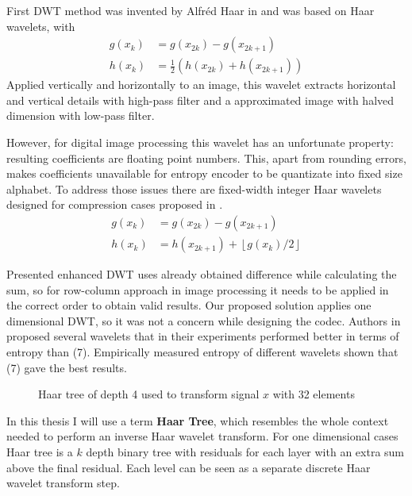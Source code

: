 First DWT method was invented by Alfréd Haar in \cite{haar1910wavelet} and was based on Haar wavelets, with 
\begin{align}
    g(x_k) &= g(x_{2k}) - g(x_{2k+1})\\
    h(x_k) &= \frac{1}{2} (h(x_{2k}) + h(x_{2k+1}))
\end{align}
Applied vertically and horizontally to an image, this wavelet extracts horizontal and vertical details
with high-pass filter and a approximated image with halved dimension with low-pass filter.

However, for digital image processing this wavelet has an unfortunate property: resulting coefficients
are floating point numbers. This, apart from rounding errors, makes coefficients unavailable for entropy encoder to be
quantizate into fixed size alphabet. To address those issues there are fixed-width integer Haar wavelets
designed for compression cases proposed in \cite{chao1998wavelet_integer}. 
\begin{align}
    g(x_k) &= g(x_{2k}) - g(x_{2k+1})\\
    h(x_k) &= h(x_{2k+1}) + \left \lfloor g(x_k)/2\right \rfloor 
\end{align}

Presented enhanced DWT uses already obtained difference while calculating the sum,
so for row-column approach in image processing it needs to be applied in the 
correct order to obtain valid results. Our proposed solution applies one dimensional DWT, so 
it was not a concern while designing the codec. Authors in \cite{chao1998wavelet_integer} proposed several
wavelets that in their experiments performed better in terms of entropy than (7). Empirically
measured entropy of different wavelets shown that (7) gave the best results.


\begin{figure}[ht]
    \centering 
    \caption{Haar tree of depth 4 used to transform signal $x$ with 32 elements}
\end{figure}
In this thesis I will use a term \textbf{Haar Tree}, which resembles the whole context needed to perform
an inverse Haar wavelet transform. For one dimensional cases Haar tree is a $k$ depth binary tree with residuals
for each layer with an extra sum above the final residual. Each level can be seen as a separate discrete Haar wavelet transform step.

